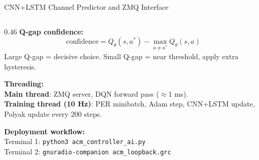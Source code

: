 \documentclass[aspectratio=169,10pt]{beamer}
\begin{document}
\begin{frame}[fragile,shrink=10]{CNN+LSTM Channel Predictor and ZMQ Interface}
\begin{columns}[T]
\begin{column}{0.46\textwidth}
      \textbf{Q-gap confidence:}
      \[\text{confidence}=Q_\theta(s,a^*)-\max_{a\neq a^*}Q_\theta(s,a)\]
      Large Q-gap = decisive choice. Small Q-gap = near threshold, apply extra hysteresis.

      \vspace{0.3em}
      \textbf{Threading:}\\
      \scriptsize \textbf{Main thread}: ZMQ server, DQN forward pass ($\approx$1 ms).\\
      \textbf{Training thread (10 Hz)}: PER minibatch, Adam step, CNN+LSTM update, Polyak update every 200 steps.

      \vspace{0.2em}
      \textbf{Deployment workflow:}\\
      \scriptsize Terminal 1: \texttt{python3 acm\_controller\_ai.py}\\
      Terminal 2: \texttt{gnuradio-companion acm\_loopback.grc}
    \end{column}
  \end{columns}
\end{frame}
\end{document}
